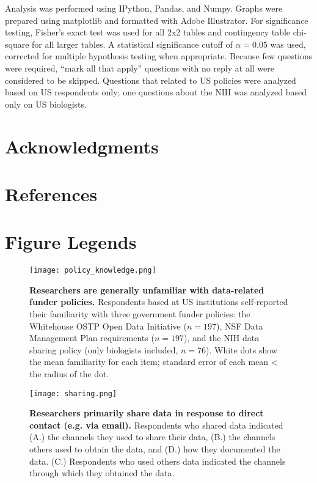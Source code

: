 \documentclass[10pt]{article}
\begin{document}
Analysis was performed using IPython\cite{perez_ipython:_2007}, Pandas\cite{mckinney_data_2010}, and Numpy\cite{van_der_walt_numpy_2011}.
Graphs were prepared using matplotlib\cite{hunter_matplotlib:_2007} and formatted with Adobe Illustrator.
For significance testing, Fisher's exact test was used for all 2x2 tables and contingency table chi-square for all larger tables.
A statistical significance cutoff of $\alpha=0.05$ was used, corrected for multiple hypothesis testing when appropriate.
Because few questions were required,  ``mark all that apply'' questions with no reply at all were considered to be skipped.
Questions that related to US policies were analyzed based on US respondents only; one questions about the NIH was analyzed based only on US biologists.

\section*{Acknowledgments}


\section*{References}


\section*{Figure Legends}

\begin{figure}[!ht]
\begin{center}
\texttt{[image: policy\_knowledge.png]}
\end{center}
\caption{
{\bf Researchers are generally unfamiliar with data-related funder policies.}
Respondents based at US institutions self-reported their familiarity with three government funder policies: the Whitehouse OSTP Open Data Initiative ($n=197$), NSF Data Management Plan requirements ($n=197$), and the NIH data sharing policy (only biologists included, $n=76$). 
White dots show the mean familiarity for each item; standard error of each mean < the radius of the dot.
}
\label{fig:policy_knowledge}
\end{figure}


\begin{figure}[!ht]
\begin{center}
\texttt{[image: sharing.png]}
\end{center}
\caption{
{\bf Researchers primarily share data in response to direct contact (e.g. via email).}
Respondents who shared data indicated (A.) the channels they used to share their data, (B.) the channels others used to obtain the data, and (D.) how they documented the data.
(C.) Respondents who used others data indicated the channels through which they obtained the data.
}
\label{fig:sharing}
\end{figure}
\end{document}
